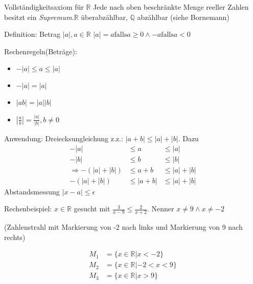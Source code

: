 Vollständigkeitsaxiom für $\mathbb{R}$
Jede nach oben beschränkte Menge reeller Zahlen besitzt ein \emph{Supremum}.$\mathbb{R}$ überabzählbar, $\mathbb{Q}$ abzählbar (siehe Bornemann)

Definition: Betrag $|a|, a \in \mathbb{R}$
$|a|=a \textrm{falls} a \geq 0 \land -a \textrm{falls} a<0$

Rechenregeln(Beträge):
\begin{itemize}
 \item $-|a|\leq a \leq |a|$
 \item $-|a| = |a|$
 \item $|ab| = |a||b|$
 \item $|\frac{a}{b}| = \frac{|a|}{|b|}, b\neq 0$
\end{itemize}

Anwendung: Dreiecksungleichung
z.z.: $|a+b| \leq |a|+|b|$. Dazu
\begin{align*}
-|a|&\leq a &\leq |a| \\
-|b|&\leq b &\leq |b| \\
\Rightarrow -(|a|+|b|)&\leq a+b &\leq |a|+|b| \\
-(|a|+|b|)&\leq |a+b| &\leq |a|+|b|
\end{align*}
Abstandsmessung $|x-a| \leq \epsilon$

Rechenbeispiel:
$x\in \mathbb{R}$ gesucht mit $\frac{3}{x-9} \leq \frac{2}{x+2}$. Nenner $x\neq9 \land x\neq -2$

(Zahlenstrahl mit Markierung von -2 nach links und Markierung von 9 nach rechts)

\begin{align*}
M_1 &= \{x \in \mathbb{R} | x < -2\} \\
M_2 &= \{x \in \mathbb{R} | -2 < x < 9\} \\
M_3 &= \{x \in \mathbb{R} | x > 9\}
\end{align*}

